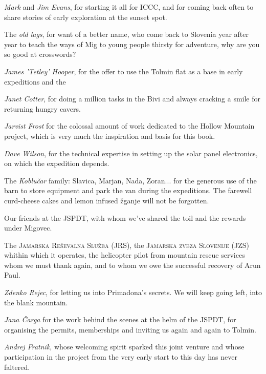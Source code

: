 \begin{citemize}
\item \emph{Mark} and \emph{Jim Evans}, for starting it all for ICCC, and for coming back often to share stories of early exploration at the sunset spot.
\item The \emph{old lags}, for want of a better name, who come back to Slovenia year after year to teach the ways of Mig to young people thirsty for adventure, why are you so good at crosswords?
\item \emph{James 'Tetley' Hooper}, for the offer to use the Tolmin flat as a base in early expeditions and the 
\item \emph{Janet Cotter}, for doing a million tasks in the Bivi and always cracking a smile for returning hungry cavers. 
\item \emph{Jarvist Frost} for the colossal amount of work dedicated to the Hollow Mountain project, which is very much the inspiration and basis for this book. 
\item \emph{Dave Wilson}, for the technical expertise in setting up the solar panel electronics, on which the expedition depends.

\item The \emph{Koblu\v{c}ar} family: Slavica, Marjan, Nada, Zoran... for the generous use of the barn to store equipment and park the van during the expeditions. The farewell curd-cheese cakes and lemon infused \v{z}ganje will not be forgotten.

\item Our friends at the JSPDT, with whom we've shared the toil and the rewards under Migovec.
\item The \textsc{Jamarska Re\v{s}evalna Slu\v{z}ba} (JRS), the \textsc{Jamarska zveza Slovenije} (JZS) whithin which it operates, the helicopter pilot from mountain rescue services whom we must thank again, and to whom we owe the successful recovery of Arun Paul.
\item \emph{Zdenko Rejec}, for letting us into Primadona's secrets. We will keep going left, into the blank mountain.
\item \emph{Jana \v{C}arga} for the work behind the scenes at the helm of the JSPDT, for organising the permits, memberships and inviting us again and again to Tolmin.
\item \emph{Andrej Fratnik}, whose welcoming spirit sparked this joint venture and whose participation in the project from the very early start to this day has never faltered. 
\end{citemize}
